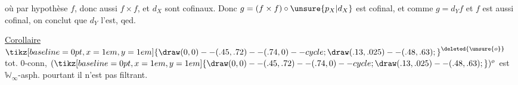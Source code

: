 où par hypothèse $f$, donc aussi $f\times f$, et $d_X$ sont cofinaux. Donc $g=(f\times f)\circ\unsure{p_X|d_X}$ est cofinal, et comme $g=d_Yf$ et $f$ est aussi cofinal, on conclut que $d_Y$ l'est, qed.

\uline{Corollaire} $\mathord{\tikz[baseline=0pt,x=1em,y=1em]{\draw (0,0)--(.45,.72)--(.74,0)--cycle; \draw (.13,.025)--(.48,.63);}}^{\deleted{\unsure{o}}}$  tot. $0$-conn, $(\mathord{\tikz[baseline=0pt,x=1em,y=1em]{\draw (0,0)--(.45,.72)--(.74,0)--cycle; \draw (.13,.025)--(.48,.63);}})^o$ est  $\mathbb W_\infty$-asph. pourtant il n'est pas filtrant.


